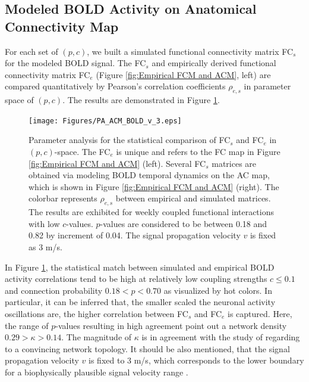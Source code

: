 \documentclass[fleqn,10pt]{wlpeerj}
\begin{document}
\newpage
\subsection*{Modeled BOLD Activity on Anatomical Connectivity Map}

For each set of $(p,c)$, we built a simulated functional connectivity matrix FC$_s$ for the modeled BOLD signal. The FC$_s$ and empirically derived functional connectivity matrix FC$_e$ (Figure \ref{fig:Empirical FCM and ACM}, left) are compared quantitatively by Pearson's correlation coefficients $\rho_{e,s}$ in parameter space of $(p,c)$. The results are demonstrated in Figure \ref{fig:PA_p_c}.


\begin{figure}[ht]\centering

	\texttt{[image: Figures/PA\_ACM\_BOLD\_v\_3.eps]}  
\caption{Parameter analysis for the statistical comparison of FC$_s$ and FC$_e$ in $(p,c)$-space. The FC$_e$ is unique and refers to the FC map in Figure \ref{fig:Empirical FCM and ACM} (left). Several FC$_s$ matrices are obtained via modeling BOLD temporal dynamics on the AC map, which is shown in Figure \ref{fig:Empirical FCM and ACM} (right). The colorbar represents $\rho_{e,s}$ between empirical and simulated matrices. The results are exhibited for weekly coupled functional interactions with low $c$-values. $p$-values are considered to be between 0.18 and 0.82 by increment of 0.04. The signal propagation velocity $v$ is fixed as 3 m/s.}
\label{fig:PA_p_c}
\end{figure}

 In Figure \ref{fig:PA_p_c}, the statistical match between simulated and empirical BOLD activity correlations tend to be high at relatively low coupling strengths $c \leq 0.1$ and connection probability $0.18 <p<0.70$ as visualized by hot colors. In particular, it can be inferred that, the smaller scaled the neuronal activity oscillations are, the higher correlation between FC$_s$ and FC$_e$ is captured. Here, the range of $p$-values resulting in high agreement point out a network density $ 0.29 > \kappa > 0.14$. The magnitude of $\kappa$ is in agreement with the study of \cite{BUL11} regarding to a convincing network topology. It should be also mentioned, that the signal propagation velocity $v$ is fixed to 3 m/s, which corresponds to the lower boundary for a biophysically plausible signal velocity range \citep{GHO08}. 
\end{document}
